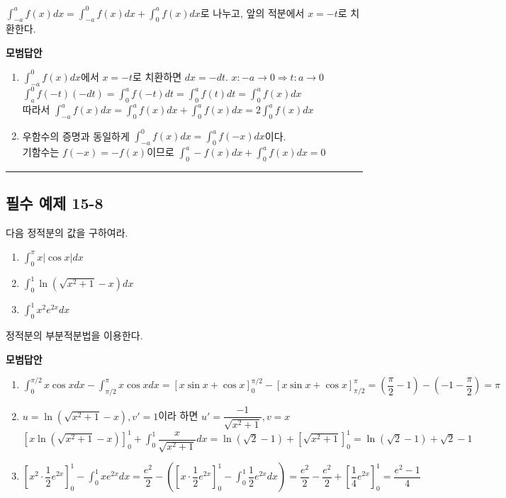 \documentclass[a4paper,11pt]{article}
\begin{document}
\begin{studybox}
$\int_{-a}^{a} f(x) dx = \int_{-a}^{0} f(x) dx + \int_{0}^{a} f(x) dx$로 나누고, 앞의 적분에서 $x=-t$로 치환한다.
\end{studybox}

\textbf{모범답안}
\begin{enumerate}[label=(\arabic*)]
    \item $\int_{-a}^{0} f(x) dx$에서 $x=-t$로 치환하면 $dx=-dt$. $x:-a \to 0 \Rightarrow t: a \to 0$\\
    $\int_{a}^{0} f(-t)(-dt) = \int_{0}^{a} f(-t) dt = \int_{0}^{a} f(t) dt = \int_{0}^{a} f(x) dx$\\
    따라서 $\int_{-a}^{a} f(x) dx = \int_{0}^{a} f(x) dx + \int_{0}^{a} f(x) dx = 2\int_{0}^{a} f(x) dx$
    \item 우함수의 증명과 동일하게 $\int_{-a}^{0} f(x) dx = \int_{0}^{a} f(-x) dx$이다.\\
    기함수는 $f(-x)=-f(x)$이므로 $\int_{0}^{a} -f(x) dx + \int_{0}^{a} f(x) dx =0$
\end{enumerate}

\vspace{0.5cm}
\hrule
\vspace{0.5cm}

\subsection*{필수 예제 15-8}
다음 정적분의 값을 구하여라.
\begin{enumerate}[label=(\arabic*)]
    \item $\displaystyle\int_{0}^{\pi} x|\cos x| dx$
    \item $\displaystyle\int_{0}^{1} \ln(\sqrt{x^2+1}-x) dx$
    \item $\displaystyle\int_{0}^{1} x^2 e^{2x} dx$
\end{enumerate}

\begin{studybox}
정적분의 부분적분법을 이용한다. 
\end{studybox}

\textbf{모범답안}
\begin{enumerate}[label=(\arabic*)]
    \item $\int_{0}^{\pi/2} x\cos x dx - \int_{\pi/2}^{\pi} x\cos x dx = [x\sin x + \cos x]_0^{\pi/2} - [x\sin x + \cos x]_{\pi/2}^\pi = (\dfrac{\pi}{2}-1) - (-1-\dfrac{\pi}{2}) = \pi$
    \item $u = \ln(\sqrt{x^2+1}-x), v' = 1$이라 하면 $u' = \dfrac{-1}{\sqrt{x^2+1}}, v = x$\\
    $[x\ln(\sqrt{x^2+1}-x)]_0^1 + \int_0^1 \dfrac{x}{\sqrt{x^2+1}} dx = \ln(\sqrt{2}-1) + [\sqrt{x^2+1}]_0^1 = \ln(\sqrt{2}-1) + \sqrt{2}-1$
    \item $[x^2 \cdot \dfrac{1}{2}e^{2x}]_0^1 - \int_0^1 x e^{2x} dx = \dfrac{e^2}{2} - ([x \cdot \dfrac{1}{2}e^{2x}]_0^1 - \int_0^1 \dfrac{1}{2}e^{2x} dx) = \dfrac{e^2}{2} - \dfrac{e^2}{2} + [\dfrac{1}{4}e^{2x}]_0^1 = \dfrac{e^2-1}{4}$
\end{enumerate}
\end{document}
